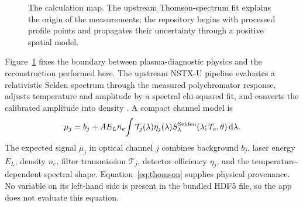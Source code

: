 \documentclass[10pt,twocolumn]{article}
\newcommand{\Data}{\mathcal{D}}
\newcommand{\dd}{\,\mathrm{d}}
\newcommand{\Te}{T_e}
\newcommand{\nelec}{n_e}
\begin{document}
\begin{figure}[t]
\centering
{}
\caption{The calculation map.  The upstream Thomson-spectrum fit explains the
origin of the measurements; the repository begins with processed profile
points and propagates their uncertainty through a positive spatial model.}
\label{fig:map}
\end{figure}

Figure~\ref{fig:map} fixes the boundary between plasma-diagnostic physics and
the reconstruction performed here.  The upstream NSTX-U pipeline evaluates a
relativistic Selden spectrum through the measured polychromator response,
adjusts temperature and amplitude by a spectral chi-squared fit, and converts
the calibrated amplitude into density \cite{laggner2019}.  A compact channel
model is
\begin{equation}
\mu_j=b_j+A E_L\nelec\!\int
\mathcal T_j(\lambda)\eta_j(\lambda)
S_{\lambda}^{\rm Selden}(\lambda;\Te,\theta)\dd\lambda .
\label{eq:thomson}
\end{equation}
The expected signal $\mu_j$ in optical channel $j$ combines background $b_j$,
laser energy $E_L$, density $\nelec$, filter transmission $\mathcal T_j$,
detector efficiency $\eta_j$, and the temperature-dependent spectral shape.
Equation~\eqref{eq:thomson} supplies physical provenance.  No variable on its
left-hand side is present in the bundled HDF5 file, so the app does not
evaluate this equation.
\end{document}

